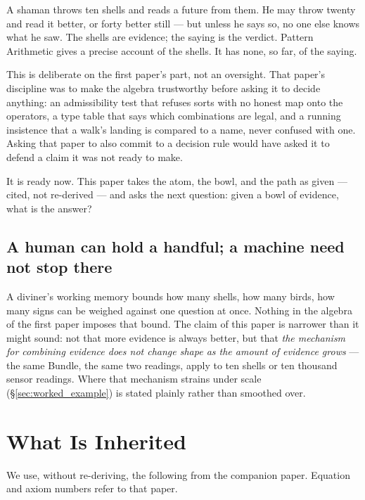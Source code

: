 \documentclass[12pt, a4paper]{article}
\begin{document}
A shaman throws ten shells and reads a future from them. He may throw
twenty and read it better, or forty better still --- but unless he
says so, no one else knows what he saw. The shells are evidence; the
saying is the verdict. Pattern Arithmetic gives a precise account of
the shells. It has none, so far, of the saying.

This is deliberate on the first paper's part, not an oversight. That
paper's discipline was to make the algebra trustworthy before asking
it to decide anything: an admissibility test that refuses sorts with
no honest map onto the operators, a type table that says which
combinations are legal, and a running insistence that a walk's landing
is compared to a name, never confused with one. Asking that paper to
also commit to a decision rule would have asked it to defend a claim
it was not ready to make.

It is ready now. This paper takes the atom, the bowl, and the path as
given --- cited, not re-derived --- and asks the next question: given
a bowl of evidence, what is the answer?

\subsection{A human can hold a handful; a machine need not stop
there}
A diviner's working memory bounds how many shells, how many birds, how
many signs can be weighed against one question at once. Nothing in
the algebra of the first paper imposes that bound. The claim of this
paper is narrower than it might sound: not that more evidence is
always better, but that \emph{the mechanism for combining evidence
does not change shape as the amount of evidence grows} --- the same Bundle, the same two readings, apply to ten shells or ten thousand
sensor readings. Where that mechanism strains under scale (\S\ref{sec:worked_example}) is
stated plainly rather than smoothed over.

\section{What Is Inherited}
\label{sec:inherited}

We use, without re-deriving, the following from the companion paper.
Equation and axiom numbers refer to that paper.
\end{document}
